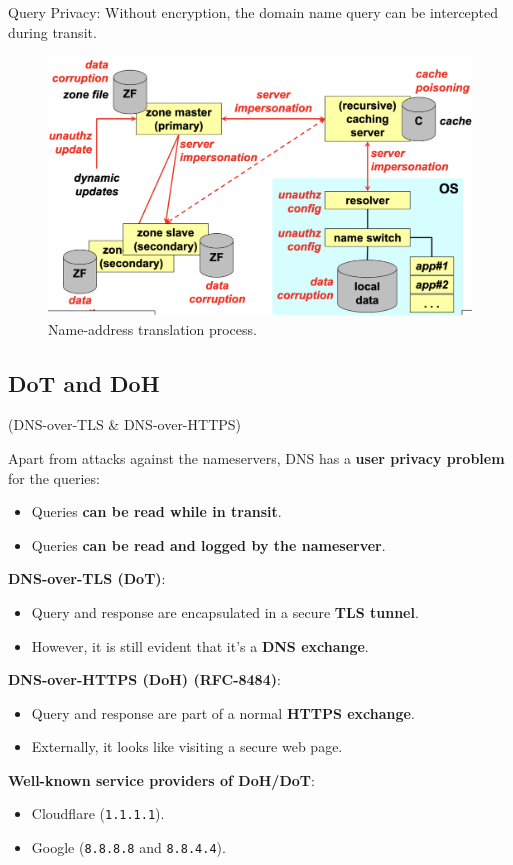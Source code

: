 \begin{tcolorbox}[colback=red!10!white, colframe=red!70!black, coltitle=white, title=Beware]
    Query Privacy: Without encryption, the domain name query can be intercepted during transit.
\end{tcolorbox}
\begin{figure}[H]
  \includegraphics[width=\linewidth]{Images/NetSec/name_address_translation.png}
  \caption{Name-address translation process.}
  \label{fig:name_address_trans}
\end{figure}


\subsection{DoT and DoH}
\begin{center}
    (DNS-over-TLS \& DNS-over-HTTPS)
\end{center}

Apart from attacks against the nameservers, DNS has a \textbf{user privacy problem} for the queries:
\begin{itemize}
    \item Queries \textbf{can be read while in transit}.
    \item Queries \textbf{can be read and logged by the nameserver}.
\end{itemize}

\textbf{DNS-over-TLS (DoT)}:
\begin{itemize}
    \item Query and response are encapsulated in a secure \textbf{TLS tunnel}.
    \item However, it is still evident that it’s a \textbf{DNS exchange}.
\end{itemize}

\textbf{DNS-over-HTTPS (DoH) (RFC-8484)}:
\begin{itemize}
    \item Query and response are part of a normal \textbf{HTTPS exchange}.
    \item Externally, it looks like visiting a secure web page.
\end{itemize}

\textbf{Well-known service providers of DoH/DoT}:
\begin{itemize}
    \item Cloudflare (\texttt{1.1.1.1}).
    \item Google (\texttt{8.8.8.8} and \texttt{8.8.4.4}).
\end{itemize}